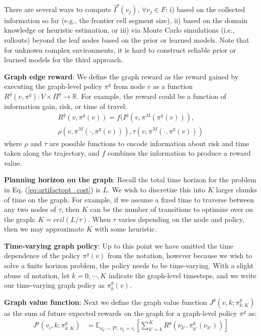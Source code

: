 \documentclass[letterpaper, 10 pt, conference]{ieeeconf}  %
\newcommand{\ph}[1]{{\textbf{#1}:}} %
\begin{document}
There are several ways to compute $\hat{I}^{g}(v_j)$, $\forall v_j \in F$:
i) based on the collected information so far (e.g., the frontier cell segment size),
ii) based on the domain knowledge or heuristic estimation, or
iii) via Monte Carlo simulations (i.e., rollouts) beyond the leaf nodes based on the prior or learned models.
Note that for unknown complex environments, it is hard to construct reliable prior or learned models for the third approach.

\ph{Graph edge reward}
We define the graph reward as the reward gained by executing the graph-level policy $\pi^g$ from node $v$ as a function $R^g(v, \pi^g): V \times \Pi^g \to \mathbb{R}$.  For example, the reward could be a function of information gain, risk, or time of travel:
\begin{multline}
    R^g(v, \pi^g(v)) = f(I^g(v,\pi^M(\pi^g(v))),\\
    \rho(v,\pi^M(\cdot,\pi^g(v))),\tau(v,\pi^M(\cdot,\pi^g(v)))
\end{multline}
where $\rho$ and $\tau$ are possible functions to encode information about risk and time taken along the trajectory, and $f$ combines the information to produce a reward value.

\ph{Planning horizon on the graph}
Recall the total time horizon for the problem in Eq. (\ref{eq:artifactopt_cost}) is $L$.  We wish to discretize this into $K$ larger chunks of time on the graph.  For example, if we assume a fixed time to traverse between any two nodes of $\tau$, then $K$ can be the number of transitions to optimize over on the graph: $K=ceil(L/\tau)$.  When $\tau$ varies depending on the node and policy, then we may approximate $K$ with some heuristic.

\ph{Time-varying graph policy}
Up to this point we have omitted the time dependence of the policy $\pi^g(v)$ from the notation, however because we wish to solve a finite horizon problem, the policy needs to be time-varying.  With a slight abuse of notation, let $k=0,\cdots,K$ indicate the graph-level timesteps, and we write our time-varying graph policy as $\pi^g_k(v)$. 

\ph{Graph value function}
Next we define the graph value function $J^g(v,k;\pi^g_{k:K})$ as the sum of future expected rewards on the graph for a graph-level policy $\pi^g$ as:
\begin{align}
    J^g(v_i,k;\pi^g_{k:K}) &= \mathbb{E}_{\nu_{k'}\sim T^g,\, \nu_k=v_i} \left[ \sum_{k'=k}^K R^g(\nu_{k'}, \pi^g_{k'}(\nu_{k'})) \right]
    \label{eq:graphvaluefn}
\end{align}
\end{document}
